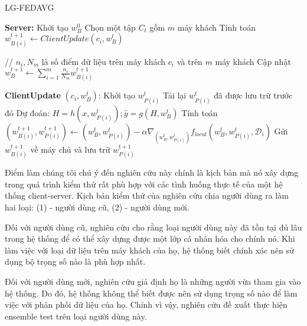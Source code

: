 \begin{algorithm}[H]
    \caption{LG-FEDAVG \cite{liang2020think}}\label{alg:lg_fedavg}
    \begin{algorithmic}[1]
        \State \textbf{Server:}
        \State Khởi tạo $w_B^0$
            \State Chọn một tập $C_t$ gồm $m$ máy khách
                \State Tính toán $w_{B(i)}^{t+1} \gets ClientUpdate(c_i,w_B^t)$
            \EndFor

            \State // $n_i, N_m$ là số điểm dữ liệu trên máy khách $c_i$ và trên $m$ máy khách
            \State Cập nhật $w_B^{t+1} \gets \sum_{i=1}^m\frac{n_i}{N_m} w_{B(i)}^{t+1}$ %
        \EndFor

        \Statex

        \State \textbf{ClientUpdate} $(c_i, w_B^t)$: %
            \State Khởi tạo $w_{P(i)}^t$
        \Else
            \State Tải lại $w_{P(i)}^t$ đã được lưu trữ trước đó
        \EndIf
        \State Dự đoán: $H = h(x, w_{P(i)}^t); \hat{y} = g(H, w_B^t)$
        \State Tính toán $(w_{B(i)}^{t+1}, w_{P(i)}^{t+1}) \gets (w_{B}^t, w_{P(i)}^t) - \alpha\nabla_{(w_{B}^t, w_{P(i)}^t)} f_{local}(w_{B}^t, w_{P(i)}^t, \mathcal{D}_i)$
        \State Gửi $w_{B(i)}^{t+1}$ về máy chủ và lưu trữ $w_{P(i)}^{t+1}$
    \end{algorithmic}
\end{algorithm}

Điểm làm chúng tôi chú ý đến nghiên cứu này chính là kịch bản mà nó xây dựng trong quá trình kiểm thử rất phù hợp với các tình huống thực tế của một hệ thống client-server. Kịch bản kiểm thử của nghiên cứu \cite{liang2020think} chia người dùng ra làm hai loại: (1) - người dùng cũ, (2) - người dùng mới.

Đối với người dùng cũ, nghiên cứu cho rằng loại người dùng này đã tồn tại đủ lâu trong hệ thống để có thể xây dựng được một lớp cá nhân hóa cho chính nó. Khi làm việc với loại dữ liệu trên máy khách của họ, hệ thống biết chính xác nên sử dụng bộ trọng số nào là phù hợp nhất.

\label{ensemble_test}
Đối với người dùng mới, nghiên cứu giả định họ là những người vừa tham gia vào hệ thống. Do đó, hệ thống không thể biết được nên sử dụng trọng số nào để làm việc với phân phối dữ liệu của họ. Chính vì vậy, nghiên cứu đề xuất thực hiện ensemble test trên loại người dùng này.

